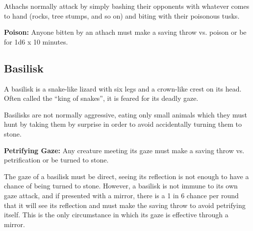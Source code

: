 \begin{multicols*}{2}
Athachs normally attack by simply bashing their opponents with whatever comes to hand (rocks, tree stumps, and so on) and biting with their poisonous tusks.

\textbf{Poison:} Anyone bitten by an athach must make a saving throw vs. poison or be  for 1d6 x 10 minutes.

\subsection{Basilisk}

A basilisk is a snake-like lizard with six legs and a crown-like crest on its head. Often called the “king of snakes”, it is feared for its deadly gaze.

Basilisks are not normally aggressive, eating only small animals which they must hunt by taking them by surprise in order to avoid accidentally turning them to stone.

\textbf{Petrifying Gaze:} Any creature meeting its gaze must make a saving throw vs. petrification or be turned to stone.

The gaze of a basilisk must be direct, seeing its reflection is not enough to have a chance of being turned to stone. However, a basilisk is not immune to its own gaze attack, and if presented with a mirror, there is a 1 in 6 chance per round that it will see its reflection and must make the saving throw to avoid petrifying itself. This is the only circumstance in which its gaze is effective through a mirror.


\end{multicols*}
